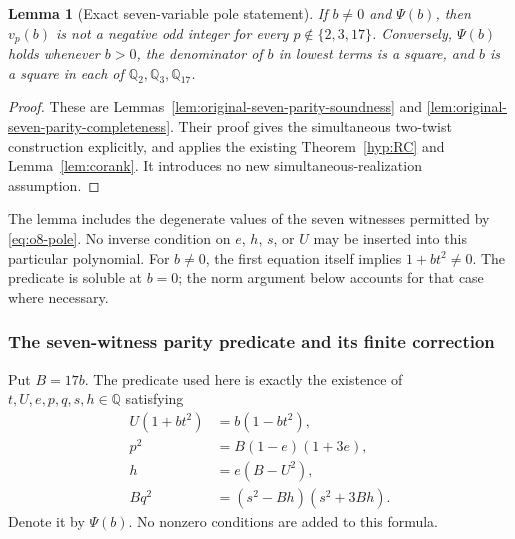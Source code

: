 \documentclass[11pt]{article}
\newtheorem{lemma}[theorem]{Lemma}
\theoremstyle{definition}
\theoremstyle{remark}
\newcommand{\Q}{\mathbb Q}
\begin{document}
\begin{lemma}[Exact seven-variable pole statement]\label{hyp:o8-pole}
If $b\ne0$ and $\Psi(b)$, then $v_p(b)$ is not a negative odd integer
for every $p\notin\{2,3,17\}$. Conversely, $\Psi(b)$ holds whenever
$b>0$, the denominator of $b$ in lowest terms is a square, and $b$ is
a square in each of $\Q_2,\Q_3,\Q_{17}$.
\end{lemma}
\begin{proof}
These are Lemmas~\ref{lem:original-seven-parity-soundness} and
\ref{lem:original-seven-parity-completeness}. Their proof gives the
simultaneous two-twist construction explicitly, and applies the existing
Theorem~\ref{hyp:RC} and Lemma~\ref{lem:corank}. It introduces no new
simultaneous-realization assumption.
\end{proof}

The lemma includes the degenerate values of the seven witnesses
permitted by \eqref{eq:o8-pole}. No inverse condition on $e$, $h$, $s$,
or $U$ may be inserted into this particular polynomial. For $b\ne0$,
the first equation itself implies $1+bt^2\ne0$. The predicate is soluble
at $b=0$; the norm argument below accounts for that case where necessary.

\subsubsection{The seven-witness parity predicate and its finite correction}
\label{subsec:original-seven-parity}
Put $B=17b$. The predicate used here is exactly the existence of
$t,U,e,p,q,s,h\in\mathbb Q$ satisfying
\begin{align}
 U(1+bt^2)&=b(1-bt^2),\label{eq:seven-param}\\
 p^2&=B(1-e)(1+3e),\label{eq:seven-first}\\
 h&=e(B-U^2),\label{eq:seven-h}\\
 Bq^2&=(s^2-Bh)(s^2+3Bh).\label{eq:seven-second}
\end{align}
Denote it by $\Psi(b)$. No nonzero conditions are added to this formula.
\end{document}
